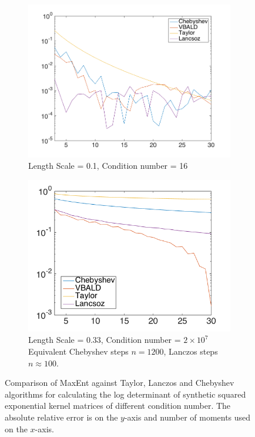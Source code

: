 \documentclass[letterpaper]{article} %
\begin{document}
\begin{figure}
	\begin{subfigure}%
		\centering
		\includegraphics[width=1\linewidth]{propercond30dim0p1}
		\caption{Length Scale = 0.1, Condition number = 16}
		\label{fig:lscale0.1}
	\end{subfigure}
	\begin{subfigure}%
		\centering
		\includegraphics[width=1\linewidth]{69500756condl0p33}
		\caption{Length Scale = 0.33, Condition number = $2\times 10^{7}$ Equivalent Chebyshev steps $n=1200$, Lanczos steps $n\approx 100$.}
		\label{fig:lscale0.33}
	\end{subfigure}
	\caption{Comparison of MaxEnt against Taylor, Lanczos and Chebyshev algorithms for calculating the log determinant of synthetic squared exponential kernel matrices of different condition number. The absolute relative error is on the $y$-axis and number of moments used on the $x$-axis.}
\end{figure}
\end{document}
